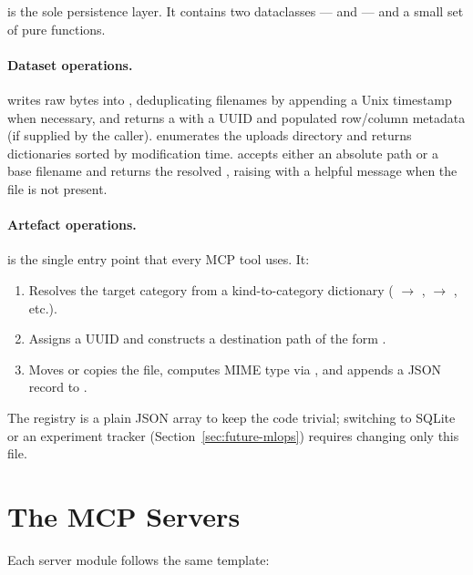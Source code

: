  is the sole persistence layer. It contains
two dataclasses ---  and 
--- and a small set of pure functions.

\paragraph{Dataset operations.}
 writes raw
bytes into , deduplicating filenames by appending
a Unix timestamp when necessary, and returns a 
with a UUID and populated row/column metadata (if supplied by the
caller).  enumerates the uploads directory and
returns dictionaries sorted by modification time.
 accepts either an absolute path or
a base filename and returns the resolved , raising
 with a helpful message when the file is not
present.

\paragraph{Artefact operations.}
is the single entry point that every MCP tool uses. It:
\begin{enumerate}[leftmargin=1.4em]
  \item Resolves the target category from a kind-to-category
        dictionary ( $\rightarrow$ ,
         $\rightarrow$ , etc.).
  \item Assigns a UUID and constructs a destination path of the form
        .
  \item Moves or copies the file, computes MIME type via
        , and appends a JSON record to
        .
\end{enumerate}
The registry is a plain JSON array to keep the code trivial;
switching to SQLite or an experiment tracker (Section~\ref{sec:future-mlops})
requires changing only this file.

\section{The MCP Servers}
\label{sec:servers-design}

Each server module follows the same template:

